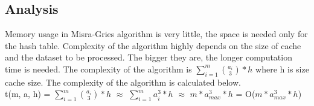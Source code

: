 \subsection{Analysis}
\label{AnalysisMisraGries}
Memory usage in Misra-Gries algorithm is very little, the space is needed only for the hash table. Complexity of the algorithm highly depends on the size of cache and the dataset to be processed. The bigger they are, the longer computation time is needed. The complexity of the algorithm is \(\sum\limits_{i=1}^m{a_i \choose 3}*h\) where h is size cache size. The complexity of the algorithm is calculated below.
\\
t(m, a, h) = \(\sum\limits_{i=1}^m{a_i \choose 3}*h\) \(\approx\) \(\sum\limits_{i=1}^m{a_i^3}*h\) \(\approx\) \(m * a_{max}^3 * h\) = O(\(m * a_{max}^3 * h\))